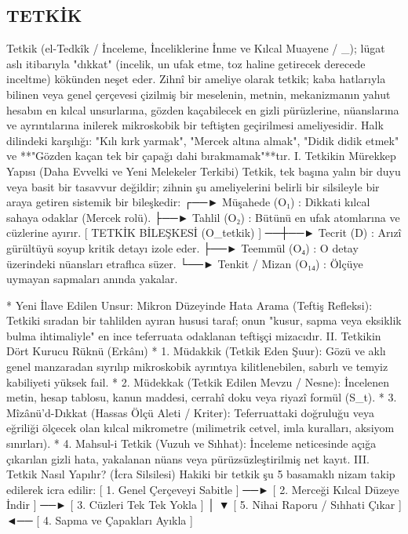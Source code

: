 \documentclass[11pt,a4paper]{article}
\begin{document}
\subsection{TETKİK}




Tetkik (el-Tedkîk / İnceleme, İnceliklerine İnme ve Kılcal Muayene / _{}); lügat aslı itibarıyla "dıkkat" (incelik, un ufak etme, toz haline getirecek derecede inceltme) kökünden neşet eder.
Zihnî bir ameliye olarak tetkik; kaba hatlarıyla bilinen veya genel çerçevesi çizilmiş bir meselenin, metnin, mekanizmanın yahut hesabın en kılcal unsurlarına, gözden kaçabilecek en gizli pürüzlerine, nüanslarına ve ayrıntılarına inilerek mikroskobik bir teftişten geçirilmesi ameliyesidir.
Halk dilindeki karşılığı: "Kılı kırk yarmak", "Mercek altına almak", "Didik didik etmek" ve **"Gözden kaçan tek bir çapağı dahi bırakmamak"**tır.
I. Tetkikin Mürekkep Yapısı (Daha Evvelki ve Yeni Melekeler Terkibi)
Tetkik, tek başına yalın bir duyu veya basit bir tasavvur değildir; zihnin şu ameliyelerini belirli bir silsileyle bir araya getiren sistemik bir bileşkedir:
                                  ┌──► Müşahede (O₁)        : Dikkati kılcal sahaya odaklar (Mercek rolü).
                                  ├──► Tahlil (O₂)           : Bütünü en ufak atomlarına ve cüzlerine ayırır.
[ TETKİK BİLEŞKESİ (O_tetkik) ] ──┼──► Tecrit (D)           : Arızî gürültüyü soyup kritik detayı izole eder.
                                  ├──► Teemmül (O₄)         : O detay üzerindeki nüansları etraflıca süzer.
                                  └──► Tenkit / Mizan (O₁₄) : Ölçüye uymayan sapmaları anında yakalar.

 * Yeni İlave Edilen Unsur: Mikron Düzeyinde Hata Arama (Teftiş Refleksi):
   Tetkiki sıradan bir tahlilden ayıran hususi taraf; onun "kusur, sapma veya eksiklik bulma ihtimaliyle" en ince teferruata odaklanan teftişçi mizacıdır.
II. Tetkikin Dört Kurucu Rüknü (Erkânı)
 * 1. Müdakkik (Tetkik Eden Şuur): Gözü ve aklı genel manzaradan sıyrılıp mikroskobik ayrıntıya kilitlenebilen, sabırlı ve temyiz kabiliyeti yüksek fail.
 * 2. Müdekkak (Tetkik Edilen Mevzu / Nesne): İncelenen metin, hesap tablosu, kanun maddesi, cerrahî doku veya riyazî formül (S_t).
 * 3. Mîzânü'd-Dıkkat (Hassas Ölçü Aleti / Kriter): Teferruattaki doğruluğu veya eğriliği ölçecek olan kılcal mikrometre (milimetrik cetvel, imla kuralları, aksiyom sınırları).
 * 4. Mahsul-i Tetkik (Vuzuh ve Sıhhat): İnceleme neticesinde açığa çıkarılan gizli hata, yakalanan nüans veya pürüzsüzleştirilmiş net kayıt.
III. Tetkik Nasıl Yapılır? (İcra Silsilesi)
Hakiki bir tetkik şu 5 basamaklı nizam takip edilerek icra edilir:
[ 1. Genel Çerçeveyi Sabitle ] ──► [ 2. Merceği Kılcal Düzeye İndir ] ──► [ 3. Cüzleri Tek Tek Yokla ]
                                                                                   │
                                                                                   ▼
[ 5. Nihai Raporu / Sıhhati Çıkar ] ◄── [ 4. Sapma ve Çapakları Ayıkla ]
\end{document}
